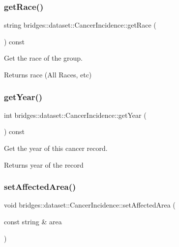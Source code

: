 \subsubsection{\texorpdfstring{getRace()}{getRace()}}
{\footnotesize\ttfamily string bridges\+::dataset\+::\+Cancer\+Incidence\+::get\+Race (\begin{DoxyParamCaption}{ }\end{DoxyParamCaption}) const\hspace{0.3cm}{\ttfamily [inline]}}



Get the race of the group. 

\begin{DoxyReturn}{Returns}
race (All Races, etc) 
\end{DoxyReturn}
\mbox{\label{classbridges_1_1dataset_1_1_cancer_incidence_a106905192829e115ed5e1f911d4c8c08}} 
\subsubsection{\texorpdfstring{getYear()}{getYear()}}
{\footnotesize\ttfamily int bridges\+::dataset\+::\+Cancer\+Incidence\+::get\+Year (\begin{DoxyParamCaption}{ }\end{DoxyParamCaption}) const\hspace{0.3cm}{\ttfamily [inline]}}



Get the year of this cancer record. 

\begin{DoxyReturn}{Returns}
year of the record 
\end{DoxyReturn}
\mbox{\label{classbridges_1_1dataset_1_1_cancer_incidence_a0eaa01e6c760702ca0e69dca16919c9b}} 
\subsubsection{\texorpdfstring{setAffectedArea()}{setAffectedArea()}}
{\footnotesize\ttfamily void bridges\+::dataset\+::\+Cancer\+Incidence\+::set\+Affected\+Area (\begin{DoxyParamCaption}\item[{const string \&}]{area }\end{DoxyParamCaption})\hspace{0.3cm}{\ttfamily [inline]}}




